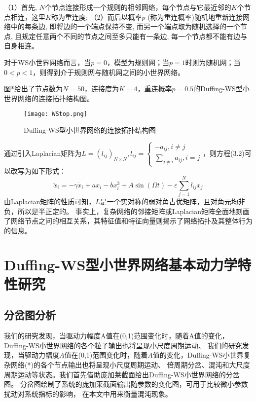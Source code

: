 （1）首先, $N$个节点连接形成一个规则的相邻网络，每个节点与它最近邻的$K$个节点相连，这里$K$称为重连度;
（2）而后以概率$p$ (称为重连概率)随机地重新连接网络中的每条边,
即将边的一个端点保持不变, 而另一个端点取为随机选择的一个节点, 且规定任意两个不同的节点之间至多只能有一条边, 每一个节点都不能有边与自身相连。

对于WS小世界网络而言，当$p = 0$，模型为规则网；当$p = 1$时则为随机网；当$0 < p < 1$，则得到介于规则网与随机网之间的小世界网络。

图*给出了节点数为$N=50$，连接度为$K = 4$，重连概率$p = 0.5$的Duffing-WS型小世界网络的连接拓扑结构图。
\begin{figure}[!htbp]
   \centering
   \texttt{[image: WStop.png]}\caption{Duffing-WS型小世界网络的连接拓扑结构图}
\end{figure}
通过引入Laplacian矩阵为$L=\left(l_{ij}\right)_{N\times N},l_{ij}=\begin{cases}
    -a_{ij},i\neq j \\ \sum_{j\neq i}a_{ij},i=j
\end{cases}$，则方程(3.2)可以改写为如下形式：
\begin{equation}
    \ddot{x}_{i}=-\gamma \dot{x}_{i}+a x_{i}-b x_{i}^{3}+A \sin (\Omega t)-\varepsilon\sum_{j=1}^{N} l_{i j} x_{j}
\end{equation}
由Laplacian矩阵的性质可知，$L$是一个实对称的弱对角占优矩阵，且对角元均非负，所以是半正定的。
事实上，复杂网络的邻接矩阵或Laplacian矩阵全面地刻画了网络节点之问的相互关系，其特征值和特征向量则揭示了网络拓扑及其整体行为的信息。

\section{Duffing-WS型小世界网络基本动力学特性研究}
\subsection{分岔图分析}
我们的研究发现，当驱动力幅度A值在(0,1)范围变化时，随着A值的变化，Duffing-WS小世界网络的各个粒子输出也将呈现小尺度周期运动、
我们的研究发现，当驱动力幅度$A$值在(0,1)范围变化时，随着$A$值的变化，Duffing-WS小世界复杂网络(*)的各个节点输出也将呈现小尺度周期运动、
倍周期分岔、混沌和大尺度周期运动等状态。我们首先借助庞加莱截面给出Duffing-WS小世界网络的分岔图。 分岔图绘制了系统的庞加莱截面输出随参数的变化图，可用于比较微小参数扰动对系统指标的影响，
在本文中用来衡量混沌现象。

